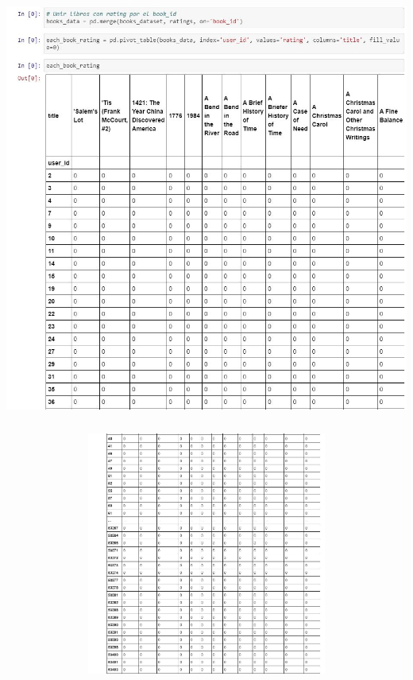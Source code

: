 \begin{center}
\includegraphics[width=18cm, height=14cm]{./Imagenes/traba5.jpg}
\end{center}

\begin{center}
\includegraphics[width=18cm, height=8cm]{./Imagenes/traba6.jpg}
\end{center}


